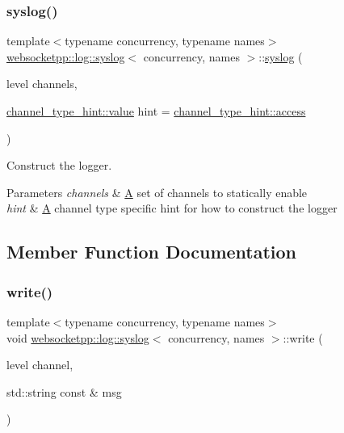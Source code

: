 \subsubsection{\texorpdfstring{syslog()}{syslog()}\hspace{0.1cm}{\footnotesize\ttfamily [2/2]}}
{\footnotesize\ttfamily template$<$typename concurrency, typename names$>$ \\
\mbox{\hyperlink{classwebsocketpp_1_1log_1_1syslog}{websocketpp\+::log\+::syslog}}$<$ concurrency, names $>$\+::\mbox{\hyperlink{classwebsocketpp_1_1log_1_1syslog}{syslog}} (\begin{DoxyParamCaption}\item[{level}]{channels,  }\item[{\mbox{\hyperlink{structwebsocketpp_1_1log_1_1channel__type__hint_ad12a7f6555b71aabdc4cbec604dc89dd}{channel\+\_\+type\+\_\+hint\+::value}}}]{hint = {\ttfamily \mbox{\hyperlink{structwebsocketpp_1_1log_1_1channel__type__hint_a8c38587fffbffbfcfc35577734b0d653}{channel\+\_\+type\+\_\+hint\+::access}}} }\end{DoxyParamCaption})\hspace{0.3cm}{\ttfamily [inline]}}



Construct the logger. 


\begin{DoxyParams}{Parameters}
{\em channels} & \mbox{\hyperlink{struct_a}{A}} set of channels to statically enable \\
\hline
{\em hint} & \mbox{\hyperlink{struct_a}{A}} channel type specific hint for how to construct the logger \\
\hline
\end{DoxyParams}


\subsection{Member Function Documentation}
\mbox{\label{classwebsocketpp_1_1log_1_1syslog_a48c3f60a621c9ffd9cebbe0959a29ca6}} 
\subsubsection{\texorpdfstring{write()}{write()}\hspace{0.1cm}{\footnotesize\ttfamily [1/2]}}
{\footnotesize\ttfamily template$<$typename concurrency, typename names$>$ \\
void \mbox{\hyperlink{classwebsocketpp_1_1log_1_1syslog}{websocketpp\+::log\+::syslog}}$<$ concurrency, names $>$\+::write (\begin{DoxyParamCaption}\item[{level}]{channel,  }\item[{std\+::string const \&}]{msg }\end{DoxyParamCaption})\hspace{0.3cm}{\ttfamily [inline]}}



